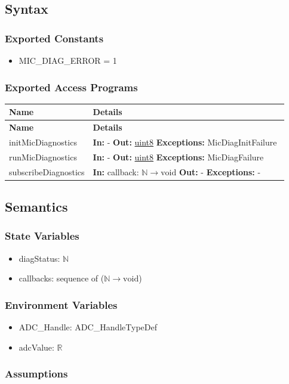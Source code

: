 \documentclass[12pt, titlepage]{article}
\newenvironment{apitable}{%
\begin{center}
\begin{longtable}{|p{0.3\linewidth}|p{0.7\linewidth}|} 
\hline
\textbf{Name} & \textbf{Details} \\
\hline
\endfirsthead
\hline
\textbf{Name} & \textbf{Details} \\
\hline
\endhead
\hline
\endfoot
\hline
\endlastfoot
}{%
\end{longtable}
\end{center}
}
\newcommand{\apifunc}[4]{%
#1 & 
\textbf{In:} #2 \newline
\textbf{Out:} #3 \newline
\textbf{Exceptions:} #4 \\
\hline
}
\begin{document}
\subsection{Syntax}
\subsubsection{Exported Constants}
\begin{itemize}
  \item MIC\_DIAG\_ERROR = 1
\end{itemize}

\subsubsection{Exported Access Programs}
\begin{apitable}
  \apifunc{initMicDiagnostics}
    {-}
    {\hyperref[generic:uint8]{uint8}}
    {MicDiagInitFailure}
  \apifunc{runMicDiagnostics}
    {-}
    {\hyperref[generic:uint8]{uint8}}
    {MicDiagFailure}
  \apifunc{subscribeDiagnostics}
    {callback: \(\mathbb{N} \rightarrow \text{void}\)}{-}{-}
\end{apitable}

\subsection{Semantics}
\subsubsection{State Variables}
\begin{itemize}
  \item diagStatus: \(\mathbb{N}\)
  \item callbacks: sequence of (\(\mathbb{N} \rightarrow \text{void}\))
\end{itemize}

\subsubsection{Environment Variables}
\begin{itemize}
  \item ADC\_Handle: ADC\_HandleTypeDef
  \item adcValue: \(\mathbb{R}\)
\end{itemize}

\subsubsection{Assumptions}
\end{document}
